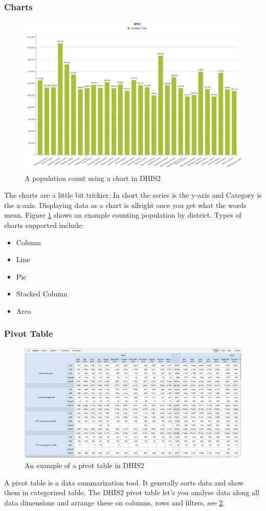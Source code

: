 \subsubsection{Charts}
\begin{figure}
\centering
\includegraphics[width=12cm]{empirical/images/chart_rwanda_population_2013}
\caption{A population count using a chart in DHIS2}
\label{fig:a_population_count_using_a_chart_in_dhis2}
\end{figure}
The charts are a little bit trickier. In short the series is the y-axis and Category is the x-axis. Displaying data as a chart is allright once you get what the words mean.
Figure \ref{fig:a_population_count_using_a_chart_in_dhis2} shows an example counting population by district. Types of charts supported include:
\begin{itemize}
\item Column
\item Line
\item Pie
\item Stacked Column
\item Area
\end{itemize}
\cite{10}
\subsubsection{Pivot Table}
\begin{figure}
\centering
\includegraphics[width=12cm]{empirical/images/pivot_table_example}
\caption{An example of a pivot table in DHIS2\cite{10}}
\label{an_example_of_a_pivot_table_in_dhis2}
\end{figure}
A pivot table is a data summarization tool. It generally sorts data and show them in categorized table.
The DHIS2 pivot table let's you analyse data along all data dimensions and arrange these on columns, rows and filters, see \ref{an_example_of_a_pivot_table_in_dhis2}.
